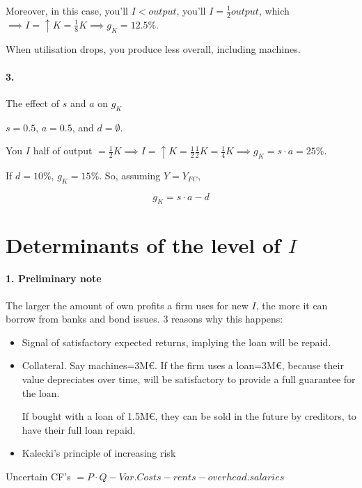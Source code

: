 \documentclass{report}
\begin{document}
Moreover, in this case, you'll $I<output$, you'll $I=\frac{1}{2}output$, which $\implies I=\uparrow K=\frac{1}{8}K \implies g_K=12.5\%$. 

When utilisation drops, you produce less overall, including machines. 

\paragraph{3. } The effect of $s$ and $a$ on $g_K$

$s=0.5$, $a=0.5$, and $d=\emptyset$. 

You $I$ half of output $=\frac{1}{2}K \implies I=\uparrow K=\frac{1}{2}\frac{1}{2}K=\frac{1}{4}K \implies g_K=s\cdot a=25\%$.

If $d=10\%$, $g_K=15\%$. So, assuming $Y=Y_{FC}$, 

\begin{equation}
    g_K=s\cdot a-d
\end{equation}

\section{Determinants of the level of $I$}

\paragraph{1. Preliminary note}

The larger the amount of own profits a firm uses for new $I$, the more it can borrow from banks and bond issues. 3 reasons why this happens: 
\begin{itemize}
    \item Signal of satisfactory expected returns, implying the loan will be repaid. 
    \item Collateral. Say machines=3M\euro. If the firm uses a loan=3M\euro, because their value depreciates over time, will be satisfactory to provide a full guarantee for the loan.
    
    If bought with a loan of 1.5M\euro, they can be sold in the future by creditors, to have their full loan repaid. 
    
    \item Kalecki's principle of increasing risk
\end{itemize}


Uncertain CF's $=P\cdot Q-Var.Costs-rents-overhead.salaries$
\end{document}
